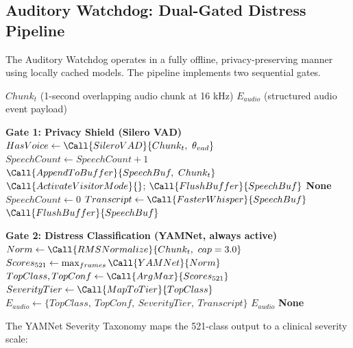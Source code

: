 \subsection{Auditory Watchdog: Dual-Gated Distress Pipeline}
\label{subsec:audio}

The Auditory Watchdog operates in a fully offline, privacy-preserving manner
using locally cached models. The pipeline implements two sequential gates.

\begin{algorithm}[H]
\caption{Auditory Watchdog: Privacy Shield and Distress Classification}
\label{alg:audio}
\begin{algorithmic}[1]
\Require $Chunk_t$ (1-second overlapping audio chunk at 16 kHz)
\Ensure $E_{audio}$ (structured audio event payload)

\Statex \textbf{Gate 1: Privacy Shield (Silero VAD)}
\State $HasVoice \gets \Call{SileroVAD}{Chunk_t,\ \theta_{vad}}$
    \State $SpeechCount \gets SpeechCount + 1$
    \State $\Call{AppendToBuffer}{SpeechBuf,\ Chunk_t}$
        \State $\Call{ActivateVisitorMode}{}$; $\Call{FlushBuffer}{SpeechBuf}$
        \State \Return \textbf{None} 
    \EndIf
\Else
    \State $SpeechCount \gets 0$
        \State $Transcript \gets \Call{FasterWhisper}{SpeechBuf}$
        \State $\Call{FlushBuffer}{SpeechBuf}$
    \EndIf
\EndIf

\Statex \textbf{Gate 2: Distress Classification (YAMNet, always active)}
\State $Norm \gets \Call{RMSNormalize}{Chunk_t,\ cap=3.0}$
\State $Scores_{521} \gets \max_{frames}\Call{YAMNet}{Norm}$
\State $TopClass, TopConf \gets \Call{ArgMax}{Scores_{521}}$
    \State $SeverityTier \gets \Call{MapToTier}{TopClass}$
    \State $E_{audio} \gets \{TopClass,\ TopConf,\ SeverityTier,\ Transcript\}$
    \State \Return $E_{audio}$
\EndIf
\State \Return \textbf{None}
\end{algorithmic}
\end{algorithm}

The YAMNet Severity Taxonomy maps the 521-class output to a clinical severity scale:

